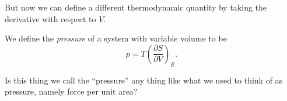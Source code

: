 \documentclass[a4paper]{article}
\begin{document}
But now we can define a different thermodynamic quantity by taking the derivative with respect to $V$.

\begin{defi}[Pressure]
  We define the \emph{pressure} of a system with variable volume to be
  \[
    p = T \left(\frac{\partial S}{\partial V}\right)_E.
  \]
\end{defi}
Is this thing we call the ``pressure'' any thing like what we used to think of as pressure, namely force per unit area?

\printindex
\end{document}

